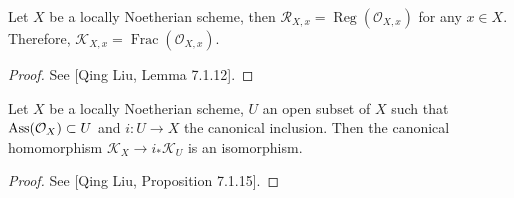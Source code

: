 


\begin{lem}
Let $X$ be a locally Noetherian scheme, then 
$\mathcal R_{X,x}=\operatorname{Reg}(\mathcal O_{X,x})$ 
for any $x\in X$. Therefore, $\mathcal K_{X,x}=\operatorname{Frac}(\mathcal O_{X,x})$.
\end{lem}

\begin{proof}
	See [Qing Liu, Lemma 7.1.12].
\end{proof}

\begin{pro}
Let $X$ be a locally Noetherian scheme, $U$ an open subset of $X$ such that 
$\operatorname{Ass}(\mathcal O_X)\subset U$ and 
$i:U\to X$ the canonical inclusion. Then the canonical homomorphism 
$\mathcal K_X\to i_*\mathcal K_U$ is an isomorphism.
\end{pro}

\begin{proof}
	See [Qing Liu, Proposition 7.1.15].
\end{proof}

